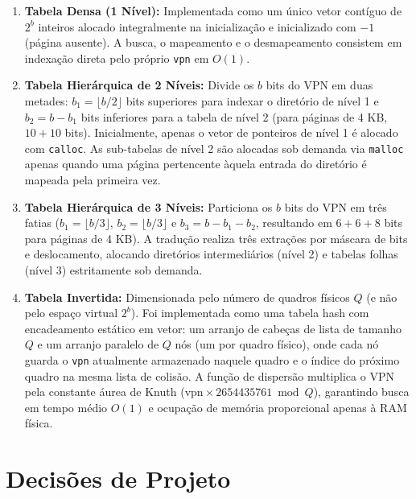 \documentclass[12pt,a4paper]{article}
\begin{document}
\begin{enumerate}
    \item \textbf{Tabela Densa (1 Nível):} Implementada como um único vetor contíguo de $2^b$ inteiros alocado integralmente na inicialização e inicializado com $-1$ (página ausente). A busca, o mapeamento e o desmapeamento consistem em indexação direta pelo próprio \texttt{vpn} em $O(1)$.
    \item \textbf{Tabela Hierárquica de 2 Níveis:} Divide os $b$ bits do VPN em duas metades: $b_1 = \lfloor b/2 \rfloor$ bits superiores para indexar o diretório de nível 1 e $b_2 = b - b_1$ bits inferiores para a tabela de nível 2 (para páginas de 4 KB, $10 + 10$ bits). Inicialmente, apenas o vetor de ponteiros de nível 1 é alocado com \texttt{calloc}. As sub-tabelas de nível 2 são alocadas sob demanda via \texttt{malloc} apenas quando uma página pertencente àquela entrada do diretório é mapeada pela primeira vez.
    \item \textbf{Tabela Hierárquica de 3 Níveis:} Particiona os $b$ bits do VPN em três fatias ($b_1 = \lfloor b/3 \rfloor$, $b_2 = \lfloor b/3 \rfloor$ e $b_3 = b - b_1 - b_2$, resultando em $6 + 6 + 8$ bits para páginas de 4 KB). A tradução realiza três extrações por máscara de bits e deslocamento, alocando diretórios intermediários (nível 2) e tabelas folhas (nível 3) estritamente sob demanda.
    \item \textbf{Tabela Invertida:} Dimensionada pelo número de quadros físicos $Q$ (e não pelo espaço virtual $2^b$). Foi implementada como uma tabela hash com encadeamento estático em vetor: um arranjo de cabeças de lista de tamanho $Q$ e um arranjo paralelo de $Q$ nós (um por quadro físico), onde cada nó guarda o \texttt{vpn} atualmente armazenado naquele quadro e o índice do próximo quadro na mesma lista de colisão. A função de dispersão multiplica o VPN pela constante áurea de Knuth ($\text{vpn} \times 2654435761 \bmod Q$), garantindo busca em tempo médio $O(1)$ e ocupação de memória proporcional apenas à RAM física.
\end{enumerate}

\section{Decisões de Projeto}
\end{document}
